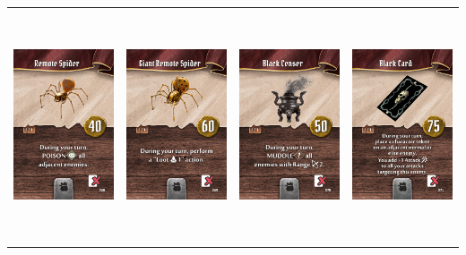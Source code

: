 \documentclass{minimal}
\begin{document}
{\begin{longtable}{llll}
\includegraphics[width=44mm,height=68mm]{./64-151/gh-126-remote-spider.png} &
\includegraphics[width=44mm,height=68mm]{./64-151/gh-127-giant-remote-spider.png} &
\includegraphics[width=44mm,height=68mm]{./64-151/gh-128-black-censer.png} &
\includegraphics[width=44mm,height=68mm]{./64-151/gh-129-black-card.png}\\ 

\end{longtable}}
\end{document}
